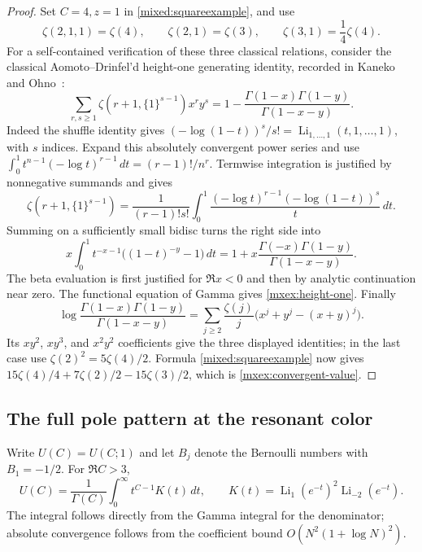 \begin{proof}
Set $C=4,z=1$ in \eqref{mixed:squareexample}, and use
\[
 \zeta(2,1,1)=\zeta(4),\qquad
 \zeta(2,1)=\zeta(3),\qquad
 \zeta(3,1)=\frac14\zeta(4).
\]
For a self-contained verification of these three classical relations,
consider the classical Aomoto--Drinfel'd height-one generating identity,
recorded in Kaneko and Ohno~\cite[Eq.~(5)]{mxex:KanekoOhno2010}:
\begin{equation}\label{mxex:height-one}
 \sum_{r,s\geq1}\zeta(r+1,\{1\}^{s-1})x^ry^s
   =1-\frac{\Gamma(1-x)\Gamma(1-y)}{\Gamma(1-x-y)}.
\end{equation}
Indeed the shuffle identity gives
$(-\log(1-t))^s/s!=\operatorname{Li}_{1,\ldots,1}(t,1,\ldots,1)$,
with $s$ indices.  Expand this absolutely convergent power series and
use
$\int_0^1t^{n-1}(-\log t)^{r-1}\,dt=(r-1)!/n^r$.
Termwise integration is justified by nonnegative summands and gives
\[
 \zeta(r+1,\{1\}^{s-1})
 =\frac1{(r-1)!s!}\int_0^1
   \frac{(-\log t)^{r-1}(-\log(1-t))^s}{t}\,dt.
\]
Summing on a sufficiently small bidisc turns the right side into
\[
 x\int_0^1t^{-x-1}\bigl((1-t)^{-y}-1\bigr)\,dt
 =1+x\frac{\Gamma(-x)\Gamma(1-y)}{\Gamma(1-x-y)}.
\]
The beta evaluation is first justified for $\Re x<0$ and then by
analytic continuation near zero.  The functional equation of Gamma
gives \eqref{mxex:height-one}.  Finally
\[
 \log\frac{\Gamma(1-x)\Gamma(1-y)}{\Gamma(1-x-y)}
 =\sum_{j\geq2}\frac{\zeta(j)}j
   \bigl(x^j+y^j-(x+y)^j\bigr).
\]
Its $xy^2$, $xy^3$, and $x^2y^2$ coefficients give the three displayed
identities; in the last case use $\zeta(2)^2=5\zeta(4)/2$.
Formula \eqref{mixed:squareexample} now gives
$15\zeta(4)/4+7\zeta(2)/2-15\zeta(3)/2$, which is
\eqref{mxex:convergent-value}.
\end{proof}

\subsection{The full pole pattern at the resonant color}

Write $U(C)=U(C;1)$ and let $B_j$ denote the Bernoulli numbers with
$B_1=-1/2$.  For $\Re C>3$,
\begin{equation}\label{mxex:mellin}
 U(C)=\frac1{\Gamma(C)}\int_0^\infty t^{C-1}K(t)\,dt,
 \qquad
 K(t)=\operatorname{Li}_1(e^{-t})^2
                  \operatorname{Li}_{-2}(e^{-t}).
\end{equation}
The integral follows directly from the Gamma integral for the denominator;
absolute convergence follows from the coefficient bound $O(N^2(1+\log N)^2)$.

